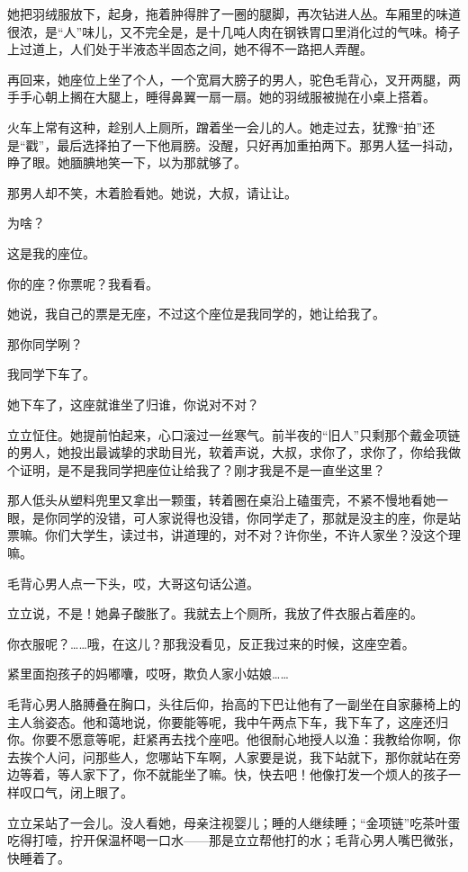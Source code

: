 \documentclass[lang=cn,newtx,12pt,scheme=chinese]{elegantbook}
\begin{document}
她把羽绒服放下，起身，拖着肿得胖了一圈的腿脚，再次钻进人丛。车厢里的味道很浓，是“人”味儿，又不完全是，是十几吨人肉在钢铁胃口里消化过的气味。椅子上过道上，人们处于半液态半固态之间，她不得不一路把人弄醒。

再回来，她座位上坐了个人，一个宽肩大膀子的男人，驼色毛背心，叉开两腿，两手手心朝上搁在大腿上，睡得鼻翼一扇一扇。她的羽绒服被抛在小桌上搭着。

火车上常有这种，趁别人上厕所，蹭着坐一会儿的人。她走过去，犹豫“拍”还是“戳”，最后选择拍了一下他肩膀。没醒，只好再加重拍两下。那男人猛一抖动，睁了眼。她腼腆地笑一下，以为那就够了。

那男人却不笑，木着脸看她。她说，大叔，请让让。

为啥？

这是我的座位。

你的座？你票呢？我看看。

她说，我自己的票是无座，不过这个座位是我同学的，她让给我了。

那你同学咧？

我同学下车了。

她下车了，这座就谁坐了归谁，你说对不对？

立立怔住。她提前怕起来，心口滚过一丝寒气。前半夜的“旧人”只剩那个戴金项链的男人，她投出最诚挚的求助目光，软着声说，大叔，求你了，求你了，你给我做个证明，是不是我同学把座位让给我了？刚才我是不是一直坐这里？

那人低头从塑料兜里又拿出一颗蛋，转着圈在桌沿上磕蛋壳，不紧不慢地看她一眼，是你同学的没错，可人家说得也没错，你同学走了，那就是没主的座，你是站票嘛。你们大学生，读过书，讲道理的，对不对？许你坐，不许人家坐？没这个理嘛。

毛背心男人点一下头，哎，大哥这句话公道。

立立说，不是！她鼻子酸胀了。我就去上个厕所，我放了件衣服占着座的。

你衣服呢？……哦，在这儿？那我没看见，反正我过来的时候，这座空着。

紧里面抱孩子的妈嘟囔，哎呀，欺负人家小姑娘……

毛背心男人胳膊叠在胸口，头往后仰，抬高的下巴让他有了一副坐在自家藤椅上的主人翁姿态。他和蔼地说，你要能等呢，我中午两点下车，我下车了，这座还归你。你要不愿意等呢，赶紧再去找个座吧。他很耐心地授人以渔：我教给你啊，你去挨个人问，问那些人，您哪站下车啊，人家要是说，我下站就下，那你就站在旁边等着，等人家下了，你不就能坐了嘛。快，快去吧！他像打发一个烦人的孩子一样叹口气，闭上眼了。

立立呆站了一会儿。没人看她，母亲注视婴儿；睡的人继续睡；“金项链”吃茶叶蛋吃得打噎，拧开保温杯喝一口水——那是立立帮他打的水；毛背心男人嘴巴微张，快睡着了。
\end{document}
